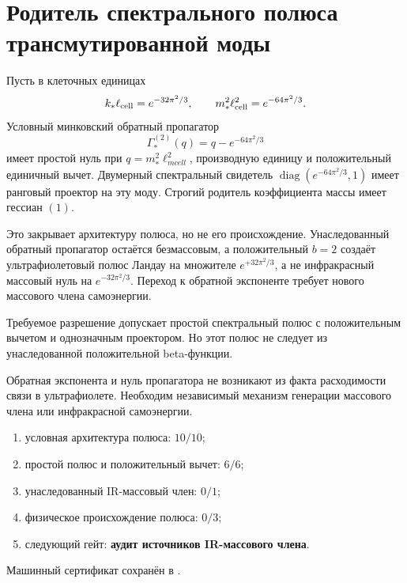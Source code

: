 \chapter{Родитель спектрального полюса трансмутированной моды}
\label{ch:v10-discrete-resolution-transmuted-spectral-pole}

Пусть в клеточных единицах
\begin{equation}
 k_*\ell_{\rm cell}=e^{-32\pi^2/3},\qquad
 m_*^2\ell_{\rm cell}^2=e^{-64\pi^2/3}.
\end{equation}
Условный минковский обратный пропагатор
\begin{equation}
 \Gamma_*^{(2)}(q)=q-e^{-64\pi^2/3}
\end{equation}
имеет простой нуль при $q=m_*^2\ell_{
m cell}^2$, производную единицу и
положительный единичный вычет. Двумерный спектральный свидетель
$\operatorname{diag}(e^{-64\pi^2/3},1)$ имеет ранговый проектор на эту
моду. Строгий родитель коэффициента массы имеет гессиан $(1)$.

Это закрывает архитектуру полюса, но не его происхождение. Унаследованный
обратный пропагатор остаётся безмассовым, а положительный $b=2$ создаёт
ультрафиолетовый полюс Ландау на множителе $e^{+32\pi^2/3}$, а не
инфракрасный массовый нуль на $e^{-32\pi^2/3}$. Переход к обратной
экспоненте требует нового массового члена самоэнергии.

\begin{theorem}
Требуемое разрешение допускает простой спектральный полюс с положительным
вычетом и однозначным проектором. Но этот полюс не следует из
унаследованной положительной beta-функции.
\end{theorem}

\begin{nogocriterion}
Обратная экспонента и нуль пропагатора не возникают из факта расходимости
связи в ультрафиолете. Необходим независимый механизм генерации массового
члена или инфракрасной самоэнергии.
\end{nogocriterion}

\begin{protocol}\begin{enumerate}
\item условная архитектура полюса: \textbf{$10/10$};
\item простой полюс и положительный вычет: \textbf{$6/6$};
\item унаследованный IR-массовый член: \textbf{$0/1$};
\item физическое происхождение полюса: \textbf{$0/3$};
\item следующий гейт: \textbf{аудит источников IR-массового члена}.
\end{enumerate}\end{protocol}

Машинный сертификат сохранён в
.